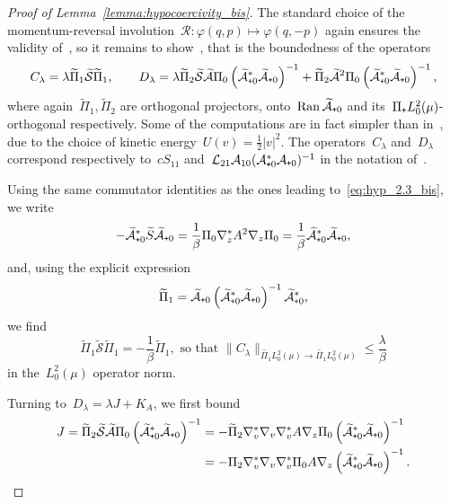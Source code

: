 \documentclass[10pt]{article}
\newcommand{\cL}{\mathcal{L}}
\newcommand{\cR}{\mathcal{R}}
\newcommand{\cA}{\mathcal{A}}
\newcommand{\cS}{\mathcal{S}}
\newcommand{\wLmuz}{L^2_0(\mu)}
\newcommand{\subplus}{\textnormal{\texttt{+}}}
\newcommand{\1}{\mathbbm 1}
\begin{document}
\begin{proof}[Proof of Lemma~\ref{lemma:hypocoercivity_bis}]
    The standard choice of the momentum-reversal involution~$\cR:\varphi(q,p)\mapsto \varphi(q,-p)$ again ensures the validity of~\cite[Assumption 2.5]{BFLS22}, so it remains to show~\cite[Assumption 2.6]{BFLS22}, that is the boundedness of the operators
    \begin{equation}
        \label{eq:def_CD}
        C_\lambda=\lambda\widetilde{\Pi}_1\widetilde{\cS}\widetilde{\Pi}_1,\qquad D_\lambda=\lambda\widetilde{\Pi}_2\widetilde{\cS}\widetilde{\cA}\Pi_0\left(\widetilde{\cA}_{\subplus 0}^*\widetilde{\cA}_{\subplus 0}\right)^{-1}+\widetilde{\Pi}_2{\widetilde{\cA}^2}\Pi_0\left(\widetilde{\cA}_{\subplus 0}^*\widetilde{\cA}_{\subplus 0}\right)^{-1},
    \end{equation}where again~$\widetilde{\Pi}_1,\widetilde{\Pi}_2$ are orthogonal projectors, onto~$\mathrm{Ran}\,\widetilde{\cA}_{\subplus 0}$ and its~$\Pi_{\subplus}\wLmuz$-orthogonal respectively. Some of the computations are in fact simpler than in~\cite{BFLS22}, due to the choice of kinetic energy~$U(v)=\frac12|v|^2$. The operators~$C_\lambda$ and~$D_\lambda$ correspond respectively to~$cS_{11}$ and~$\cL_{21}\cA_{10}(\cA_{\subplus 0}^*\cA_{\subplus 0})^{-1}$ in the notation of~\cite{BFLS22}.

    Using the same commutator identities as the ones leading to~\eqref{eq:hyp_2.3_bis}, we write
    \begin{equation}
        \label{eq:AstarA_identity}
        -\widetilde{\cA}^*_{\subplus 0}\widetilde{S}\widetilde{\cA}_{\subplus 0} = \frac1\beta \Pi_0\nabla_z^*A^2\nabla_z\Pi_0 = \frac1\beta \widetilde{\cA}^*_{\subplus 0}\widetilde{\cA}_{\subplus 0},
    \end{equation}
    and, using the explicit expression
    \begin{equation}
        \widetilde{\Pi}_1 = \widetilde{\cA}_{\subplus 0}\left(\widetilde{\cA}_{\subplus 0}^*\widetilde{\cA}_{\subplus 0}\right)^{-1}\widetilde{\cA}_{\subplus 0}^*,
    \end{equation}
    we find
    \begin{equation}
        \widetilde{\Pi}_1\widetilde{\cS}\widetilde{\Pi}_1 = -\frac1\beta\widetilde{\Pi}_1,\text{ so that }\|C_\lambda\|_{\widetilde{\Pi_1}\wLmuz\to\widetilde{\Pi_1}\wLmuz} \leq \frac{\lambda}{\beta}
    \end{equation}
    in the~$\wLmuz$ operator norm.

    Turning to~$D_\lambda=\lambda J + K_A$, we first bound
    \begin{equation}
        \label{eq:J_def}
        \begin{aligned}
        J=\widetilde{\Pi}_2\widetilde{\cS}\widetilde{\cA}\Pi_0\left(\widetilde{\cA}_{\subplus 0}^*\widetilde{\cA}_{\subplus 0}\right)^{-1}&=-\widetilde{\Pi}_2\nabla_v^*\nabla_v\nabla_v^* A\nabla_z\Pi_0\left({\widetilde{\mathcal A}}^*_{\subplus 0}{\widetilde{\mathcal A}}_{\subplus 0}\right)^{-1}\\
        &=-\Pi_2\nabla_v^*\nabla_v\nabla_v^*\Pi_0A\nabla_z\left({\widetilde{\mathcal A}}^*_{\subplus 0}{\widetilde{\mathcal A}}_{\subplus 0}\right)^{-1}.
        \end{aligned}
    \end{equation}


\end{proof}
\end{document}
